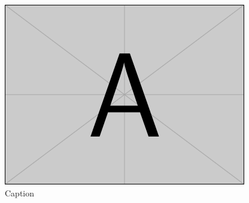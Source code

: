 \begin{figure}[htbp]
  \includegraphics[width=\linewidth]{../images/example-image-a.png}
  \caption{Caption}
  \label{fig:loss_improved_1}
\end{figure}
